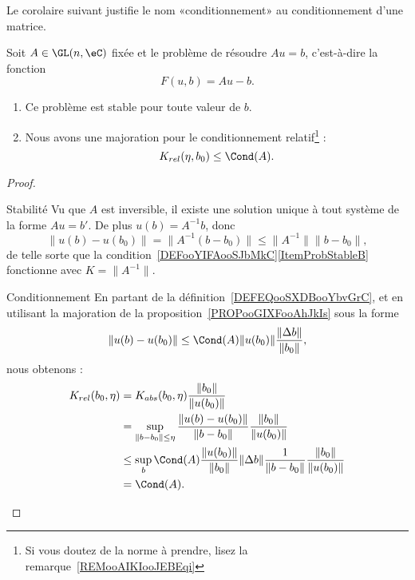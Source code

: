 Le corolaire suivant justifie le nom «conditionnement» au conditionnement d'une matrice.
\begin{corollary}       \label{CORooXKPWooJVHVvh}
    Soit \( A\in \GL(n,\eC)\) fixée et le problème de résoudre \( Au=b\), c'est-à-dire la fonction
    \begin{equation}
        F(u,b)=Au-b.
    \end{equation}
    \begin{enumerate}
        \item
            Ce problème est stable pour toute valeur de \( b\).
        \item
            Nous avons une majoration pour le conditionnement relatif\footnote{Si vous doutez de la norme à prendre, lisez la remarque~\ref{REMooAIKIooJEBEqi}} :
            \begin{equation}        \label{EQooZHQJooTMKYfr}
                K_{rel}(\eta,b_0)\leq \Cond(A).
            \end{equation}
    \end{enumerate}
\end{corollary}

\begin{proof}
    \begin{subproof}
    \item[Stabilité]
        Vu que \( A\) est inversible, il existe une solution unique à tout système de la forme \( Au=b'\). De plus \( u(b)=A^{-1} b\), donc
        \begin{equation}
            \| u(b)-u(b_0) \|= \| A^{-1}(b-b_0) \|\leq \| A^{-1} \|\| b-b_0 \|,
        \end{equation}
        de telle sorte que la condition~\ref{DEFooYIFAooSJbMkC}\ref{ItemProbStableB} fonctionne avec \( K=\| A^{-1} \|\).
    \item[Conditionnement]
        En partant de la définition~\ref{DEFEQooSXDBooYbvGrC}, et en utilisant la majoration de la proposition~\ref{PROPooGIXFooAhJkIs} sous la forme
        \begin{equation}
            \| u(b)-u(b_0) \|\leq \Cond(A)\| u(b_0) \|\frac{ \| \Delta b \| }{ \| b_0 \| },
        \end{equation}
        nous obtenons :
        \begin{subequations}
            \begin{align}
                K_{rel}(b_0,\eta)&=K_{abs}(b_0,\eta)\frac{ \| b_0 \| }{ \| u(b_0) \| }\\
                &=\sup_{\| b-b_0 \|\leq \eta}\frac{ \| u(b)-u(b_0) \| }{ \| b-b_0 \| }\frac{ \| b_0 \| }{ \| u(b_0) \| }\\
                &\leq \sup_b\Cond(A)\frac{ \| u(b_0) \| }{ \| b_0 \| }\| \Delta b \|\frac{1}{ \| b-b_0 \| }\frac{ \| b_0 \| }{ \| u(b_0) \| }\\
                &=\Cond(A).
            \end{align}
        \end{subequations}
    \end{subproof}
\end{proof}

